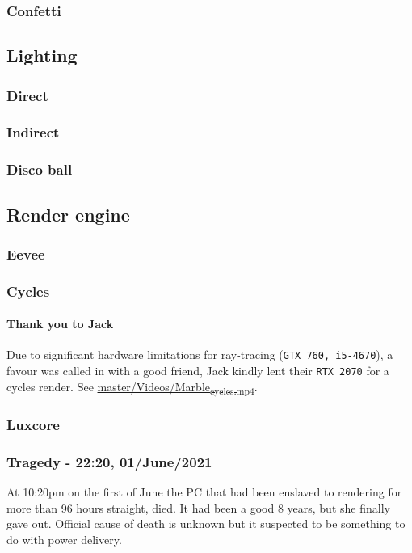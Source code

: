 \documentclass[11pt]{article}
\begin{document}
\subsubsection{Confetti}
\label{sec:orgc19d5ab}
\subsection{Lighting}
\label{sec:orgcaca2d7}
\subsubsection{Direct}
\label{sec:orgee12393}
\subsubsection{Indirect}
\label{sec:org9457f4f}
\subsubsection{Disco ball}
\label{sec:org50c698f}
\subsection{Render engine}
\label{sec:org67b78ef}
\subsubsection{Eevee}
\label{sec:org28f8243}
\subsubsection{Cycles}
\label{sec:org5805e52}
\paragraph{Thank you to Jack}
\label{sec:org6c432d0}
Due to significant hardware limitations for ray-tracing (\texttt{GTX 760, i5-4670}), a
favour was called in with a good friend, Jack kindly lent their \texttt{RTX 2070}  for a
cycles render. See \href{https://github.com/Jake-Moss/blender-chess/blob/master/Videos/Marble\_cycles.mp4}{master/Videos/Marble\textsubscript{cycles.mp4}}.
\subsubsection{Luxcore}
\label{sec:org2964bea}
\subsubsection{Tragedy - 22:20, 01/June/2021}
\label{sec:org9d7c9ff}
At 10:20pm on the first of June the PC that had been enslaved to rendering for
more than 96 hours straight, died. It had been a good 8 years, but she finally
gave out. Official cause of death is unknown but it suspected to be something to
do with power delivery.
\end{document}
